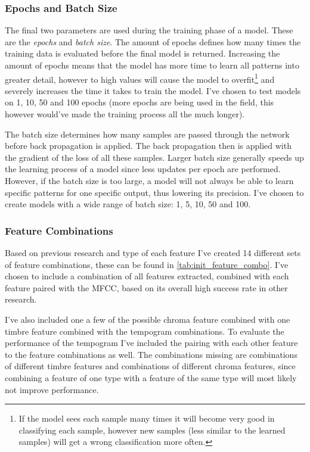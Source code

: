 \subsubsection{Epochs and Batch Size}
The final two parameters are used during the training phase of a model. These are the \textit{epochs} and \textit{batch size}. The amount of epochs defines how many times the training data is evaluated before the final model is returned. Increasing the amount of epochs means that the model has more time to learn all patterns into greater detail, however to high values will cause the model to overfit\footnote{If the model sees each sample many times it will become very good in classifying each sample, however new samples (less similar to the learned samples) will get a wrong classification more often.} and severely increases the time it takes to train the model. I've chosen to test models on 1, 10, 50 and 100 epochs (more epochs are being used in the field, this however would've made the training process all the much longer).

The batch size determines how many samples are passed through the network before back propagation is applied. The back propagation then is applied with the gradient of the loss of all these samples. Larger batch size generally speeds up the learning process of a model since less updates per epoch are performed. However, if the batch size is too large, a model will not always be able to learn specific patterns for one specific output, thus lowering its precision. I've chosen to create models with a wide range of batch size: 1, 5, 10, 50 and 100.

\subsubsection{Feature Combinations}

Based on previous research and type of each feature I've created 14 different sets of feature combinations, these can be found in \autoref{tab:init_feature_combo}. I've chosen to include a combination of all features extracted, combined with each feature paired with the MFCC, based on its overall high success rate in other research.

I've also included one a few of the possible chroma feature combined with one timbre feature combined with the tempogram combinations. To evaluate the performance of the tempogram I've included the pairing with each other feature to the feature combinations as well. The combinations missing are combinations of different timbre features and combinations of different chroma features, since combining a feature of one type with a feature of the same type will most likely not improve performance.


